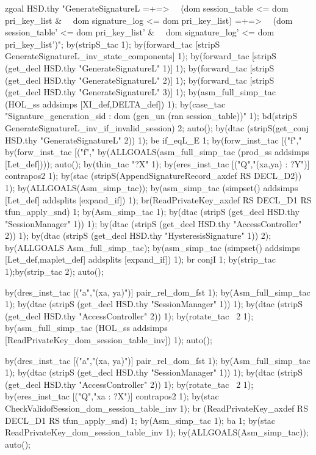 \documentclass[a4paper,pdftex]{article}
\newenvironment{holz-proof}{\comment}{\endcomment}
\begin{document}
\begin{holz-proof}
zgoal HSD.thy 
"GenerateSignatureL =+=>                            \
\   (dom session_table <= dom pri_key_list &        \
\    dom signature_log <= dom pri_key_list) =+=>    \
\   (dom session_table' <= dom pri_key_list' &      \
\    dom signature_log' <= dom pri_key_list')";
by(stripS_tac 1);
by(forward_tac [stripS GenerateSignatureL_inv_state_components] 1);
by(forward_tac [stripS (get_decl HSD.thy "GenerateSignatureL" 1)] 1);
by(forward_tac [stripS (get_decl HSD.thy "GenerateSignatureL" 2)] 1);
by(forward_tac [stripS (get_decl HSD.thy "GenerateSignatureL" 3)] 1);
by(asm_full_simp_tac (HOL_ss addsimps [XI_def,DELTA_def]) 1);
by(case_tac "Signature_generation_sid : dom (gen_un (ran session_table))" 1);
bd(stripS GenerateSignatureL_inv_if_invalid_session) 2;
auto();
by(dtac (stripS(get_conj HSD.thy "GenerateSignatureL" 2)) 1);
be if_eqL_E 1;
by(forw_inst_tac [("f","%
by(forw_inst_tac [("f","%
by(ALLGOALS(asm_full_simp_tac (prod_ss addsimps [Let_def])));
auto();
by(thin_tac "?X" 1);
by(eres_inst_tac [("Q","(xa,ya) : ?Y")] contrapos2 1);
by(stac (stripS(AppendSignatureRecord_axdef RS DECL_D2)) 1);
by(ALLGOALS(Asm_simp_tac));
by(asm_simp_tac (simpset() addsimps [Let_def] addsplits [expand_if]) 1);
br(ReadPrivateKey_axdef RS DECL_D1 RS tfun_apply_snd) 1;
by(Asm_simp_tac 1);
by(dtac (stripS (get_decl HSD.thy "SessionManager" 1)) 1);
by(dtac (stripS (get_decl HSD.thy "AccessController" 2)) 1);
by(dtac (stripS (get_decl HSD.thy "HysteresisSignature" 1)) 2);
by(ALLGOALS Asm_full_simp_tac);
by(asm_simp_tac (simpset() addsimps [Let_def,maplet_def] addsplits [expand_if]) 1);
br conjI 1; by(strip_tac 1);by(strip_tac 2);
auto();

by(dres_inst_tac [("a","(xa, ya)")] pair_rel_dom_fst 1);
by(Asm_full_simp_tac 1);
by(dtac (stripS (get_decl HSD.thy "SessionManager" 1)) 1);
by(dtac (stripS (get_decl HSD.thy "AccessController" 2)) 1);
by(rotate_tac ~2 1);
by(asm_full_simp_tac (HOL_ss addsimps [ReadPrivateKey_dom_session_table_inv]) 1);
auto();

by(dres_inst_tac [("a","(xa, ya)")] pair_rel_dom_fst 1);
by(Asm_full_simp_tac 1);
by(dtac (stripS (get_decl HSD.thy "SessionManager" 1)) 1);
by(dtac (stripS (get_decl HSD.thy "AccessController" 2)) 1);
by(rotate_tac ~2 1);
by(eres_inst_tac [("Q","xa : ?X")] contrapos2 1);
by(stac CheckValidofSession_dom_session_table_inv 1);
br (ReadPrivateKey_axdef RS DECL_D1 RS tfun_apply_snd) 1; 
by(Asm_simp_tac 1); ba 1;
by(stac ReadPrivateKey_dom_session_table_inv 1);
by(ALLGOALS(Asm_simp_tac));
auto();


\end{holz-proof}
\end{document}
